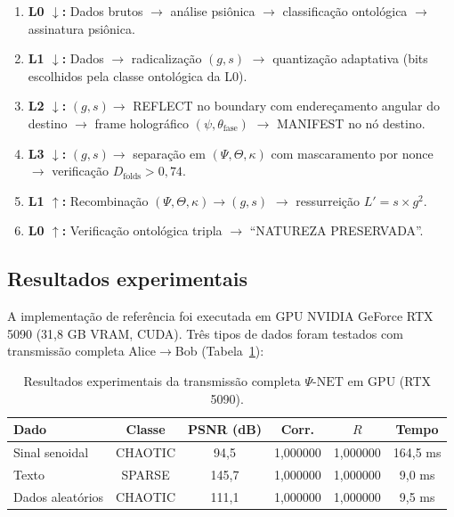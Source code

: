 \documentclass[12pt,a4paper]{article}
\newcommand{\Dfolds}{D_{\text{folds}}}
\newcommand{\PsiNet}{\Psi\text{-NET}}
\begin{document}
\begin{enumerate}[nosep]
\item \textbf{L0 $\downarrow$:} Dados brutos $\to$ análise
  psiônica $\to$ classificação ontológica $\to$ assinatura
  psiônica.
\item \textbf{L1 $\downarrow$:} Dados $\to$
  radicalização $(g, s)$ $\to$ quantização adaptativa
  (bits escolhidos pela classe ontológica da L0).
\item \textbf{L2 $\downarrow$:} $(g, s) \to$ REFLECT no
  boundary com endereçamento angular do destino $\to$ frame
  holográfico $(\psi, \theta_{\text{fase}})$ $\to$ MANIFEST
  no nó destino.
\item \textbf{L3 $\downarrow$:} $(g, s) \to$ separação em
  $(\Psi, \Theta, \kappa)$ com mascaramento por nonce $\to$
  verificação $\Dfolds > 0{,}74$.
\item \textbf{L1 $\uparrow$:} Recombinação
  $(\Psi, \Theta, \kappa) \to (g, s)$ $\to$ ressurreição
  $L' = s \times g^2$.
\item \textbf{L0 $\uparrow$:} Verificação ontológica tripla
  $\to$ ``NATUREZA PRESERVADA''.
\end{enumerate}

\subsection{Resultados experimentais}

A implementação de referência foi executada em GPU NVIDIA
GeForce RTX 5090 (31,8 GB VRAM, CUDA). Três tipos de dados
foram testados com transmissão completa Alice$\to$Bob
(Tabela~\ref{tab:resultados}):

\begin{table}[H]
\centering
\caption{Resultados experimentais da transmissão completa
$\PsiNet$ em GPU (RTX 5090).}
\label{tab:resultados}
\begin{tabular}{lccccc}
\toprule
\textbf{Dado} & \textbf{Classe} & \textbf{PSNR (dB)} &
  \textbf{Corr.} & \textbf{$R$} & \textbf{Tempo} \\
\midrule
Sinal senoidal & CHAOTIC & 94,5 & 1,000000 & 1,000000
  & 164,5 ms \\
Texto & SPARSE & 145,7 & 1,000000 & 1,000000
  & 9,0 ms \\
Dados aleatórios & CHAOTIC & 111,1 & 1,000000 & 1,000000
  & 9,5 ms \\
\bottomrule
\end{tabular}
\end{table}
\end{document}
